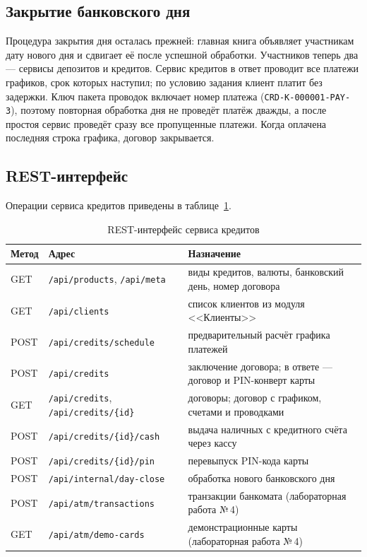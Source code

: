 \documentclass[14pt,a4paper]{extarticle}
\begin{document}
\subsection{Закрытие банковского дня}

Процедура закрытия дня осталась прежней: главная книга объявляет участникам дату нового
дня и сдвигает её после успешной обработки. Участников теперь два --- сервисы депозитов и
кредитов. Сервис кредитов в ответ проводит все платежи графиков, срок которых наступил;
по условию задания клиент платит без задержки. Ключ пакета проводок включает номер платежа
(\texttt{CRD-К-000001-PAY-3}), поэтому повторная обработка дня не проведёт платёж дважды,
а после простоя сервис проведёт сразу все пропущенные платежи. Когда оплачена последняя
строка графика, договор закрывается.

\subsection{REST-интерфейс}

Операции сервиса кредитов приведены в таблице~\ref{tab:rest}.

\begin{table}[H]
\caption{REST-интерфейс сервиса кредитов}
\label{tab:rest}
\centering
\footnotesize
\begin{tabularx}{\textwidth}{llX}
\toprule
Метод & Адрес & Назначение \\
\midrule
GET & \texttt{/api/products}, \texttt{/api/meta} & виды кредитов, валюты, банковский день, номер договора \\
GET & \texttt{/api/clients} & список клиентов из модуля <<Клиенты>> \\
POST & \texttt{/api/credits/schedule} & предварительный расчёт графика платежей \\
POST & \texttt{/api/credits} & заключение договора; в ответе --- договор и PIN-конверт карты \\
GET & \texttt{/api/credits}, \texttt{/api/credits/\{id\}} & договоры; договор с графиком, счетами и проводками \\
POST & \texttt{/api/credits/\{id\}/cash} & выдача наличных с кредитного счёта через кассу \\
POST & \texttt{/api/credits/\{id\}/pin} & перевыпуск PIN-кода карты \\
POST & \texttt{/api/internal/day-close} & обработка нового банковского дня \\
POST & \texttt{/api/atm/transactions} & транзакции банкомата (лабораторная работа №\,4) \\
GET & \texttt{/api/atm/demo-cards} & демонстрационные карты (лабораторная работа №\,4) \\
\bottomrule
\end{tabularx}
\end{table}
\end{document}
